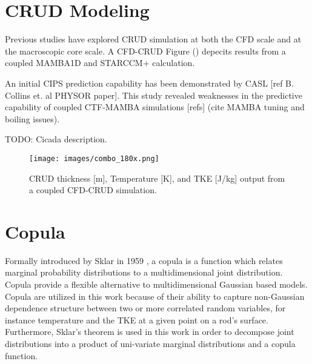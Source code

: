 \section{CRUD Modeling}

Previous studies have explored CRUD simulation at both the CFD scale and at the macroscopic core scale.  A CFD-CRUD 
Figure () depecits results from a coupled MAMBA1D and STARCCM+ calculation.    

An initial CIPS prediction capability has been demonstrated by CASL [ref B. Collins et. al PHYSOR paper].  This study revealed weaknesses in the predictive capability of coupled CTF-MAMBA simulations [refs] (cite MAMBA tuning and boiling issues).

TODO: Cicada description.

\begin{figure}[!htbp]
\centering
\texttt{[image: images/combo\_180x.png]}
\caption{CRUD thickness [m], Temperature [K], and TKE [J/kg] output from a coupled CFD-CRUD simulation.}
\label{fig:cfd2ctf_map}
\end{figure}

\section{Copula}

Formally introduced by Sklar in 1959 \cite{Sklar1959}, a copula is a function which relates marginal probability distributions to a multidimensional joint distribution.  Copula provide a flexible alternative to multidimensional Gaussian based models.  Copula are utilized in this work because of their ability to capture non-Gaussian dependence structure between two or more correlated random variables, for instance temperature and the TKE at a given point on a rod's surface.  Furthermore, Sklar's theorem is used in this work in order to decompose joint distributions into a product of uni-variate marginal distributions and a copula function.  

